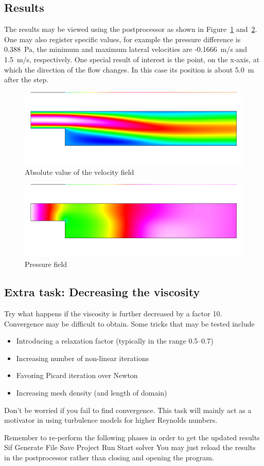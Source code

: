 \subsection*{Results}

The results may be viewed using the postprocessor as shown in Figure~\ref{fg:step_velo} and~\ref{fg:step_pres}. 
One may also register specific values,
for example the pressure difference is 0.388~Pa, the minimum and maximum lateral velocities
are -0.1666~m/s and 1.5~m/s, respectively.
One special result of interest 
is the point, on the x-axis, at which the direction of the flow changes. 
In this case its position is about 5.0~m after the step. 

\begin{figure}[h]
\centering
\includegraphics[width=15cm, viewport=0 30 900 270,clip]{velo_abs}
\caption{Absolute value of the velocity field}\label{fg:step_velo}
\end{figure} 

\begin{figure}[h]
\centering
\includegraphics[width=15cm, viewport=0 30 900 270,clip]{pres}
\caption{Pressure field}\label{fg:step_pres}
\end{figure} 

   




\subsection*{Extra task: Decreasing the viscosity}

Try what happens if the viscosity is further decreased by a factor 10. 
Convergence may be difficult to obtain. Some tricks that may be tested include
\begin{itemize}
\item Introducing a relaxation factor (typically in the range 0.5--0.7)
\item Increasing number of non-linear iterations
\item Favoring Picard iteration over Newton 
\item Increasing mesh density (and length of domain)
\end{itemize}
Don't be worried if you fail to find convergence. This task will mainly act as a 
motivator in using turbulence models for higher Reynolds numbers.

Remember to re-perform the following phases in order to get the updated results
\ttbegin
Sif 
  Generate
File 
  Save Project
Run
  Start solver
\ttend
You may just reload the results in the postprocessor rather than closing and opening the program.


\hfill
